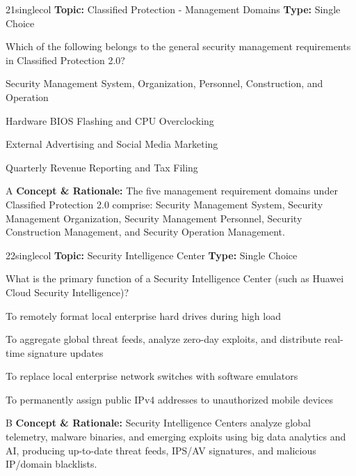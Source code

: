 \begin{qcard}{21}{singlecol}
\textcolor{darkslate!75}{\small\textbf{Topic:} Classified Protection - Management Domains \hfill \textbf{Type:} Single Choice}\vspace{0.4em}\par
Which of the following belongs to the general security management requirements in Classified Protection 2.0?
\begin{qoptions}
\item Security Management System, Organization, Personnel, Construction, and Operation
\item Hardware BIOS Flashing and CPU Overclocking
\item External Advertising and Social Media Marketing
\item Quarterly Revenue Reporting and Tax Filing
\end{qoptions}
\end{qcard}
\nopagebreak
\begin{explainbox}{A}
\textbf{Concept \& Rationale:} The five management requirement domains under Classified Protection 2.0 comprise: Security Management System, Security Management Organization, Security Management Personnel, Security Construction Management, and Security Operation Management.
\end{explainbox}

\begin{qcard}{22}{singlecol}
\textcolor{darkslate!75}{\small\textbf{Topic:} Security Intelligence Center \hfill \textbf{Type:} Single Choice}\vspace{0.4em}\par
What is the primary function of a Security Intelligence Center (such as Huawei Cloud Security Intelligence)?
\begin{qoptions}
\item To remotely format local enterprise hard drives during high load
\item To aggregate global threat feeds, analyze zero-day exploits, and distribute real-time signature updates
\item To replace local enterprise network switches with software emulators
\item To permanently assign public IPv4 addresses to unauthorized mobile devices
\end{qoptions}
\end{qcard}
\nopagebreak
\begin{explainbox}{B}
\textbf{Concept \& Rationale:} Security Intelligence Centers analyze global telemetry, malware binaries, and emerging exploits using big data analytics and AI, producing up-to-date threat feeds, IPS/AV signatures, and malicious IP/domain blacklists.
\end{explainbox}

